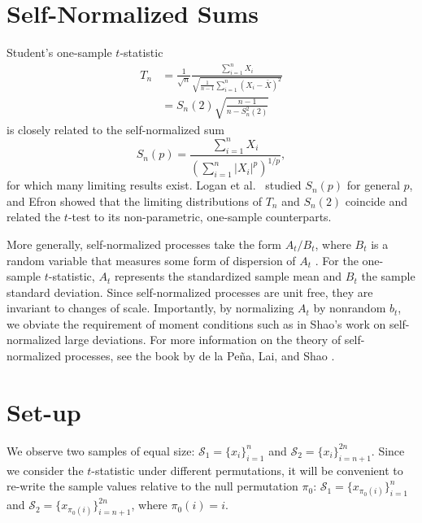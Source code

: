 \section{Self-Normalized Sums}
Student's one-sample $t$-statistic
\begin{align*}
  T_n &= \frac{1}{\sqrt{n}} \frac{\sum_{i=1}^n X_i}{\sqrt{\frac{1}{n-1} \sum_{i=1}^n(X_i - \bar{X})^2}} \\
  &= S_n(2) \sqrt{\frac{n-1}{n-S_n^2(2)}}
\end{align*}
is closely related to the self-normalized sum
\begin{equation*}
  S_n(p) = \frac{\sum_{i=1}^n X_i}{\left ( \sum_{i=1}^n|X_i|^p \right )^{1/p}},
\end{equation*}
for which many limiting results exist.  Logan et al.\
\cite{logan1973limit} studied $S_n(p)$ for general $p$, and
Efron \cite{efron1969student} showed that the limiting distributions of
$T_n$ and $S_n(2)$ coincide and related the $t$-test to its
non-parametric, one-sample counterparts.

More generally, self-normalized processes take the form $A_t/B_t$,
where $B_t$ is a random variable that measures some form of dispersion
of $A_t$ \cite{de2004self}.  For the one-sample $t$-statistic, $A_t$
represents the standardized sample mean and $B_t$ the sample standard
deviation.  Since self-normalized processes are unit free, they are invariant to changes of
scale.  Importantly, by normalizing $A_t$ by nonrandom $b_t$, we
obviate the requirement of moment conditions such as in Shao's \cite{shao1997self}
work on self-normalized large deviations.  For more information on the
theory of self-normalized processes, see the book by de la Pe{\~n}a,
Lai, and Shao \cite{MR2488094}.

\section{Set-up}
We observe two samples of equal size: $\mathcal{S}_1 = \{x_i\}_{i=1}^n$
and $\mathcal{S}_2 = \{x_i\}_{i=n+1}^{2n}$.  Since we consider the $t$-statistic
under different permutations, it will be convenient to re-write the
sample values relative to the null permutation $\pi_0$: $\mathcal{S}_1 =
\{x_{\pi_0(i)}\}_{i=1}^n$ and $\mathcal{S}_2 = \{x_{\pi_0(i)}\}_{i=n+1}^{2n}$,
where $\pi_0(i) = i$.

